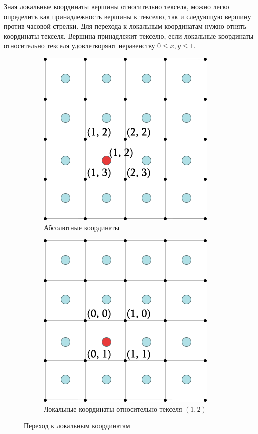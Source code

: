 \documentclass{fefu_thesis/cls/fefu}
\begin{document}
    Зная локальные координаты вершины относительно текселя, можно легко определить как принадлежность вершины к текселю, так и следующую вершину против часовой стрелки. Для перехода к локальным координатам нужно отнять координаты текселя. Вершина принадлежит текселю, если локальные координаты относительно текселя удовлетворяют неравенству $ 0 \leq x, y \leq 1$.

    \begin{figure}[H]
        \centering
        \begin{subfigure}[t]{.49\linewidth}
            \centering
            \includegraphics[scale=0.8]{images/texel_vertex_absolute.png}
            \caption{Абсолютные координаты}
        \end{subfigure}
        \begin{subfigure}[t]{.49\linewidth}
            \centering
            \includegraphics[scale=0.8]{images/texel_vertex_local.png}
            \caption{Локальные координаты относительно текселя $\left(1, 2\right)$}
        \end{subfigure}
        \caption{Переход к локальным координатам}
    \end{figure}
\end{document}
